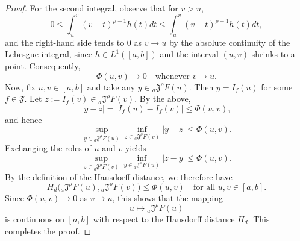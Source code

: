 \documentclass[10pt,a4paper]{amsart}
\begin{document}
\begin{proof}
For the second integral, observe that for $v>u$,
\[ 0\le\int_{u}^{v}(v-t)^{\rho-1}h(t)dt \le\int_{u}^{v}(v-t)^{\rho-1}h(t)dt, \] and the right-hand side tends to $0$ as $v\to u$ by the absolute continuity of the Lebesgue integral, since $h\in L^{1}([a,b])$ and the interval $(u,v)$ shrinks to a point. Consequently,
\[ \Phi(u,v)\to 0 \quad\text{whenever }v\to u. \]
Now, fix $u,v\in[a,b]$ and take any $y\in {}_{a}\mathfrak{J}^{\rho}F(u)$. Then
$y=I_f(u)$ for some $f\in\mathfrak{F}$. Let $z:=I_f(v)\in
{}_{a}\mathfrak{J}^{\rho}F(v)$. By the above,
\[ |y-z|=\big|I_f(u)-I_f(v)\big|\le\Phi(u,v), \]
and hence
\[\sup_{y\in {}_{a}\mathfrak{J}^{\rho}F(u)} \inf_{z\in {}_{a}\mathfrak{J}^{\rho}F(v)}|y-z| \le\Phi(u,v). \]
Exchanging the roles of $u$ and $v$ yields
\[ \sup_{z\in {}_{a}\mathfrak{J}^{\rho}F(v)} \inf_{y\in {}_{a}\mathfrak{J}^{\rho}F(u)}|z-y| \le\Phi(u,v). \]
By the definition of the Hausdorff distance, we therefore have
\[ H_d\big({}_{a}\mathfrak{J}^{\rho}F(u),{}_{a}\mathfrak{J}^{\rho}F(v)\big) \le\Phi(u,v)
\quad\text{for all }u,v\in[a,b]. \]
Since $\Phi(u,v)\to 0$ as $v\to u$, this shows that the mapping
\[u\longmapsto {}_{a}\mathfrak{J}^{\rho}F(u) \]
is continuous on $[a,b]$ with respect to the Hausdorff distance $H_d$. This completes the proof. 
\end{proof}
\end{document}
